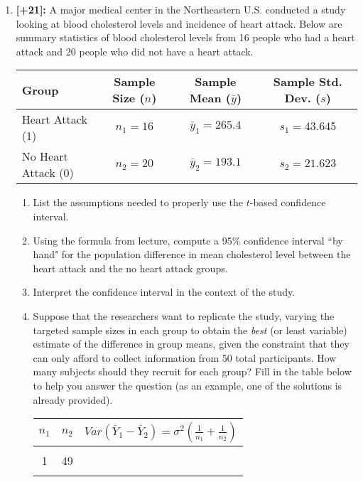 \documentclass[11pt]{article}
\begin{document}
\begin{enumerate}

\item \textbf{[+21]:} A major medical center in the Northeastern U.S. conducted a study looking at blood cholesterol levels and incidence of heart attack. Below are summary statistics of blood cholesterol levels from 16 people who had a heart attack and 20 people who did not have a heart attack.
\begin{center}
	\begin{tabular}{l|ccc}
		Group & Sample Size ($n$) & Sample Mean ($\bar y$) & Sample Std. Dev. ($s$) \\
		\hline
		Heart Attack (1) & $n_1 = 16$ & $\bar y_1 = 265.4$ & $s_1 = 43.645$ \\
		No Heart Attack (0) & $n_2 = 20$ & $\bar y_2 = 193.1$ & $s_2 = 21.623$
	\end{tabular}
\end{center}
	\begin{enumerate}
	\item List the assumptions needed to properly use the $t$-based confidence interval.
	\vspace{2in}
	\item Using the formula from lecture, compute a 95\% confidence interval ``by hand" for the population difference in mean cholesterol level between the heart attack and the no heart attack groups.
	\vspace{3in}
	\item Interpret the confidence interval in the context of the study.
	\vspace{2in}
	\item Suppose that the researchers want to replicate the study, varying the targeted sample sizes in each group to obtain the \textit{best} (or least variable) estimate of the difference in group means, given the constraint that they can only afford to collect information from 50 total participants. How many subjects should they recruit for each group? Fill in the table below to help you answer the question (as an example, one of the solutions is already provided).
	\begin{center}
		\begin{tabular}{c|c|c}
			$n_1$ & $n_2$ & $Var(\bar Y_1 - \bar Y_2) = \sigma^2 \left( \frac{1}{n_1} + \frac{1}{n_2} \right)$ \\
			\hline
			&& \\
			1 & 49 & \\
			&& \\

\end{tabular}
\end{center}
\end{enumerate}
\end{enumerate}
\end{document}

